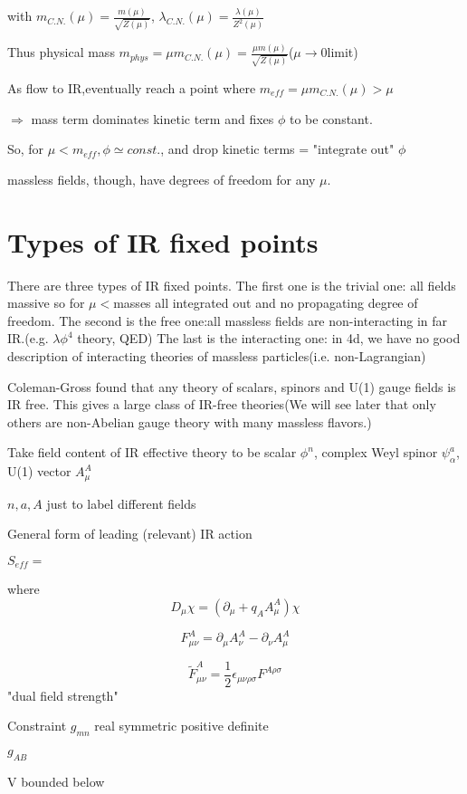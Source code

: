 \documentclass[type = bachelor]{fduthesis-en}
\begin{document}
with $m_{C.N.}(\mu)=\frac{m(\mu)}{\sqrt{Z(\mu)}}$, $\lambda_{C.N.}(\mu)=\frac{\lambda(\mu)}{Z^2(\mu)}$

Thus physical mass $m_{phys}=\mu m_{C.N.}(\mu)=\frac{\mu m(\mu)}{\sqrt{Z(\mu)}}$($\mu\rightarrow0$limit)

\bigskip As flow to IR,eventually reach a point where $m_{eff}=\mu m_{C.N.}(\mu)>\mu$

$\Rightarrow$ mass term dominates kinetic term and fixes $\phi$ to be constant.

So, for $\mu<m_{eff}, \phi\simeq const.$, and drop kinetic terms = "integrate out" $\phi$

massless fields, though, have degrees of freedom for any $\mu$.

\section{Types of IR fixed points}
There are three types of IR fixed points. The first one is the trivial one: all fields massive so for $\mu<$masses all integrated out and no propagating degree of freedom. The second is the free one:all massless fields are non-interacting in far IR.(e.g. $\lambda\phi^4$ theory, QED) The last is the interacting one: in 4d, we have no good description of interacting theories of massless particles(i.e. non-Lagrangian)

Coleman-Gross found that any theory of scalars, spinors and U(1) gauge fields is IR free. This gives a large class of IR-free theories(We will see later that only others are non-Abelian gauge theory with many massless flavors.)

Take field content of IR effective theory to be scalar $\phi^n$, complex Weyl spinor $\psi_{\alpha}^a$, U(1) vector $A_{\mu}^A$

${n,a,A}$ just to label different fields

\bigskip General form of leading (relevant) IR action

$S_{eff}=$

where $$D_{\mu}\chi=(\partial_{\mu}+q_AA_{\mu}^A)\chi$$

$$F_{\mu\nu}^A=\partial_{\mu}A_{\nu}^A-\partial_{\nu}A_{\mu}^A$$

$$\tilde{F}_{\mu\nu}^A=\frac{1}{2}\epsilon_{\mu\nu\rho\sigma}F^{A\rho\sigma}$$ "dual field strength"

Constraint $g_{mn}$ real symmetric positive definite

$g_{AB}$

V bounded below
\end{document}
